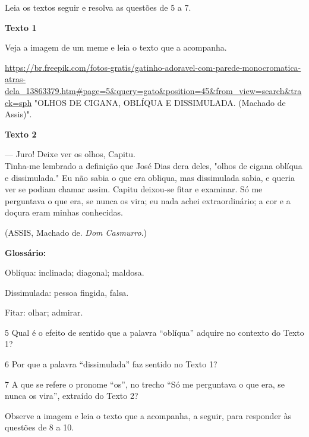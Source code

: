 {Leia os textos seguir e resolva as questões de 5 a 7.

\textbf{Texto 1}

Veja a imagem de um meme e leia o texto que a acompanha.

\url{https://br.freepik.com/fotos-gratis/gatinho-adoravel-com-parede-monocromatica-atras-dela_13863379.htm\#page=5\&query=gato\&position=45\&from_view=search\&track=sph}
"OLHOS DE CIGANA, OBLÍQUA E DISSIMULADA. (Machado de Assis)".

\textbf{Texto 2}

--- Juro! Deixe ver os olhos, Capitu.\\
Tinha-me lembrado a definição que José Dias dera deles, "olhos de cigana
oblíqua e dissimulada." Eu não sabia o que era obliqua, mas dissimulada
sabia, e queria ver se podiam chamar assim. Capitu deixou-se fitar e
examinar. Só me perguntava o que era, se nunca os vira; eu nada achei
extraordinário; a cor e a doçura eram minhas conhecidas.

(ASSIS, Machado de. \emph{Dom Casmurro}.)

\textbf{Glossário:}

Oblíqua: inclinada; diagonal; maldosa.

Dissimulada: pessoa fingida, falsa.

Fitar: olhar; admirar.

\num{5} Qual é o efeito de sentido que a palavra ``oblíqua'' adquire no
contexto do Texto 1?


\num{6} Por que a palavra ``dissimulada'' faz sentido no Texto 1?


\num{7} A que se refere o pronome ``os'', no trecho ``Só me perguntava o
que era, se nunca os vira'', extraído do Texto 2?


Observe a imagem e leia o texto que a acompanha, a seguir, para
responder às questões de 8 a 10.

}
